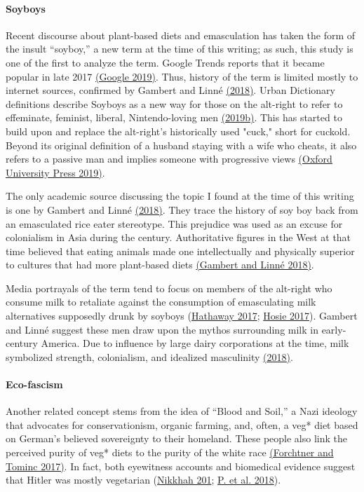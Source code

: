 \documentclass[twoside]{report}
\begin{document}
\begin{multicols}{2}
\paragraph{Soyboys}

Recent discourse about plant-based diets and emasculation has taken the
form of the insult ``soyboy,'' a new term at the time of this
writing; as such, this study is one of the first to analyze the term.
Google Trends reports that it became popular in late 2017 \hyperlink{google}{(Google 2019)}. Thus, history of the term is limited mostly to internet sources, confirmed by Gambert and Linné \hyperlink{gambert}{(2018)}. Urban Dictionary definitions describe Soyboys as a new way for those on the alt-right to refer to effeminate, feminist, liberal, Nintendo-loving men \hyperlink{2019b}{(2019b)}. This has
started to build upon and replace the alt-right's historically used
"cuck," short for cuckold. Beyond its original definition of a husband staying with a wife who cheats, it also refers to a passive man and implies someone
with progressive views \hyperlink{oxford}{(Oxford University Press 2019)}.

The only academic source discussing the topic I found at the time of
this writing is one by Gambert and Linné \hyperlink{gambert}{(2018)}. They trace the history of soy boy back from an emasculated rice eater stereotype. This prejudice was used as an excuse for colonialism in Asia during the  century. Authoritative figures in the West at that time believed that
eating animals made one intellectually and physically superior to
cultures that had more plant-based diets \hyperlink{gambert}{(Gambert and Linné 2018)}.

Media portrayals of the term tend to focus on members of the alt-right
who consume milk to retaliate against the consumption of emasculating
milk alternatives supposedly drunk by soyboys (\hyperlink{hathaway}{Hathaway 2017}; \hyperlink{hosie}{Hosie 2017}). Gambert and Linné suggest these men draw upon the mythos surrounding milk in early- century America. Due to influence by large dairy corporations at the time, milk symbolized strength, colonialism, and idealized masculinity \hyperlink{gambert}{(2018)}.

\paragraph{Eco-fascism}

Another related concept stems from the idea of ``Blood
and Soil,'' a Nazi ideology that advocates for conservationism,
organic farming, and, often, a veg* diet based on German's believed
sovereignty to their homeland. These people also
link the perceived purity of veg* diets to the purity of the white race
\hyperlink{forchtner}{(Forchtner and Tominc 2017)}. In fact, both eyewitness accounts and biomedical evidence suggest that Hitler was mostly vegetarian (\hyperlink{nikkhah}{Nikkhah 201}; \hyperlink{p}{P. et al. 2018}).


\end{multicols}
\end{document}
